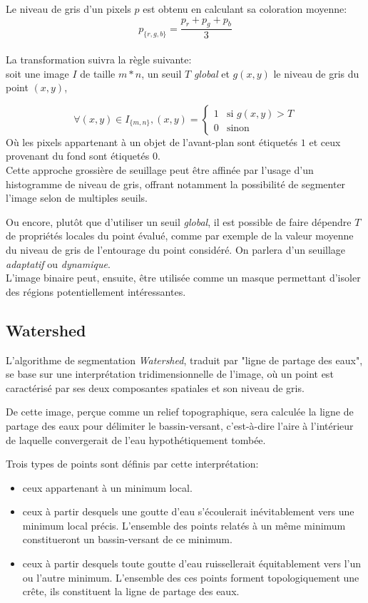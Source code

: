 \documentclass[a4paper,12pt]{report}
\begin{document}
Le niveau de gris d'un pixels $p$ est obtenu en calculant sa coloration moyenne: \[p_{\{r,g,b\}} =\frac{p_r+p_g+p_b}{3}\]\\

La transformation suivra la règle suivante:\\
soit une image $I$ de taille $m*n$, un seuil $T$ \textit{global} et $g(x,y)$ le niveau de gris du point $(x,y)$,

$$ \forall (x,y) \in I_{\{m,n\}}, (x,y) = \left\{ 
\begin{array}{rl}
1 &\mbox{si } g(x,y)>T\\
0 &\mbox{sinon}
\end{array} \right.
$$ 
Où les pixels appartenant à un objet de l'avant-plan sont étiquetés $1$ et ceux provenant du fond sont étiquetés $0$.\\ 

Cette approche grossière de seuillage peut être affinée par l'usage d'un histogramme de niveau de gris, offrant notamment la possibilité de segmenter l'image selon de multiples seuils.

Ou encore, plutôt que d'utiliser un seuil \textit{global}, il est possible de faire dépendre $T$ de propriétés locales du point évalué, comme par exemple de la valeur moyenne du niveau de gris de l'entourage du point considéré. On parlera d'un seuillage \textit{adaptatif} ou \textit{dynamique}.\\

L'image binaire peut, ensuite, être utilisée comme un masque permettant d'isoler des régions potentiellement intéressantes.

\subsection{Watershed}
L'algorithme de segmentation \textit{Watershed}, traduit par "ligne de partage des eaux", se base sur une interprétation tridimensionnelle de l'image, où un point est caractérisé par ses deux composantes spatiales et son niveau de gris.

De cette image, perçue comme un relief topographique, sera calculée la ligne de partage des eaux pour délimiter le bassin-versant, c'est-à-dire l'aire à l'intérieur de laquelle convergerait de l'eau hypothétiquement tombée. 

Trois types de points sont définis par cette interprétation:
\begin{itemize}
\item ceux appartenant à un minimum local.
\item ceux à partir desquels une goutte d'eau s'écoulerait inévitablement vers une minimum local précis. L'ensemble des points relatés à un même minimum constitueront un bassin-versant de ce minimum.
\item ceux à partir desquels toute goutte d'eau ruissellerait équitablement vers l'un ou l'autre minimum. L'ensemble des ces points forment topologiquement une crête, ils constituent la ligne de partage des eaux.\\
\end{itemize} 
 
\end{document}
